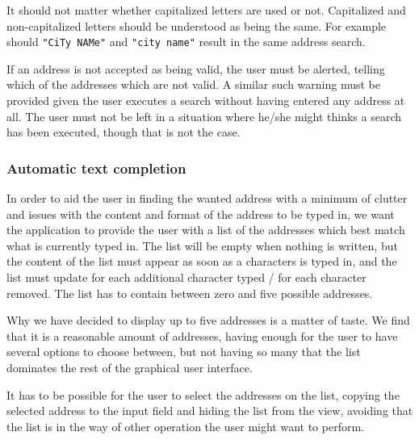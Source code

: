 \documentclass[a4paper,11pt]{article}
\begin{document}
It should not matter whether capitalized letters are used or not. Capitalized and non-capitalized letters should be understood as being the same. For example should \texttt{"CiTy NAMe"} and \texttt{"city name"} result in the same address search.

If an address is not accepted as being valid, the user must be alerted, telling which of the addresses which are not valid. A similar such warning must be provided given the user executes a search without having entered any address at all. The user must not be left in a situation where he/she might thinks a search has been executed, though that is not the case.

\subsubsection{Automatic text completion}
In order to aid the user in finding the wanted address with a minimum of clutter and issues with the content and format of the address to be typed in, we want the application to provide the user with a list of the addresses which best match what is currently typed in. The list will be empty when nothing is written, but the content of the list must appear as soon as a characters is typed in, and the list must update for each additional character typed / for each character removed. The list has to contain between zero and five possible addresses.

Why we have decided to display up to five addresses is a matter of taste. We find that it is a reasonable amount of addresses, having enough for the user to have several options to choose between, but not having so many that the list dominates the rest of the graphical user interface.

It has to be possible for the user to select the addresses on the list, copying the selected address to the input field and hiding the list from the view, avoiding that the list is in the way of other operation the user might want to perform.
\end{document}
